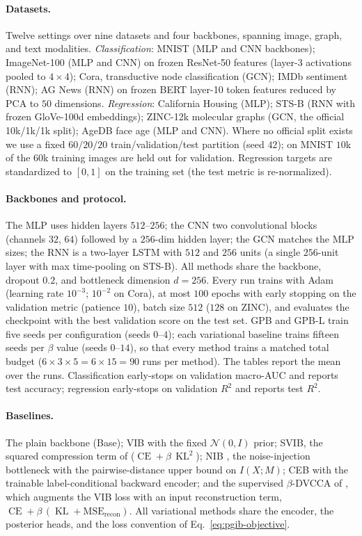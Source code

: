 \documentclass{article} %
\theoremstyle{plain}
\theoremstyle{remark}
\renewcommand{\KL}{\operatorname{KL}}
\DeclareMathOperator{\CE}{CE}
\begin{document}
\paragraph{Datasets.} Twelve settings over nine datasets and four backbones, spanning
image, graph, and text modalities. \emph{Classification}: MNIST (MLP and CNN
backbones); ImageNet-100 (MLP and CNN) on frozen ResNet-50 features (layer-3
activations pooled to $4\times4$); Cora, transductive node classification (GCN);
IMDb sentiment (RNN); AG News (RNN) on frozen BERT layer-10 token features reduced
by PCA to $50$ dimensions. \emph{Regression}: California Housing (MLP); STS-B
(RNN with frozen GloVe-100d embeddings); ZINC-12k molecular graphs (GCN, the
official 10k/1k/1k split); AgeDB face age (MLP and CNN). Where no official
split exists we use a fixed $60/20/20$ train/validation/test partition (seed $42$);
on MNIST $10$k of the $60$k training images are held out for validation. Regression
targets are standardized to $[0,1]$ on the training set (the test metric is
re-normalized).

\paragraph{Backbones and protocol.} The MLP uses hidden layers $512$--$256$; the CNN
two convolutional blocks (channels $32$, $64$) followed by a $256$-dim hidden layer;
the GCN matches the MLP sizes; the RNN is a two-layer LSTM with $512$ and $256$
units (a single $256$-unit layer with max time-pooling on STS-B). All methods share
the backbone, dropout $0.2$, and bottleneck dimension $d = 256$. Every run trains
with Adam (learning rate $10^{-3}$; $10^{-2}$ on Cora), at most $100$ epochs with
early stopping on the validation metric (patience $10$), batch size $512$ ($128$ on
ZINC), and evaluates the checkpoint with the best validation score on the test set.
GPB and GPB-L train five seeds per configuration (seeds $0$--$4$); each
variational baseline trains fifteen seeds per $\beta$ value (seeds $0$--$14$), so
that every method trains a matched total budget ($6\times3\times5 = 6\times15 =
90$ runs per method). The tables report the mean over the runs. Classification
early-stops on validation macro-AUC and reports test accuracy; regression
early-stops on validation $R^2$ and reports test $R^2$.

\paragraph{Baselines.} The plain backbone (Base); VIB \citep{alemi2017deep} with the
fixed $\mathcal{N}(0,I)$ prior; SVIB, the squared compression term of
\citet{kolchinsky2019caveats} ($\CE + \beta\,\KL^2$); NIB
\citep{kolchinsky2017nonlinear}, the noise-injection bottleneck with the
pairwise-distance upper bound on $I(X;M)$; CEB \citep{fischer2020conditional} with
the trainable label-conditional backward encoder; and the supervised $\beta$-DVCCA
of \citet{abdelaleem2025deep}, which augments the VIB loss with an input
reconstruction term, $\CE + \beta\,(\KL + \mathrm{MSE}_{\mathrm{recon}})$. All
variational methods
share the encoder, the posterior heads, and the loss convention of
Eq.~\eqref{eq:pgib-objective}.
\end{document}
